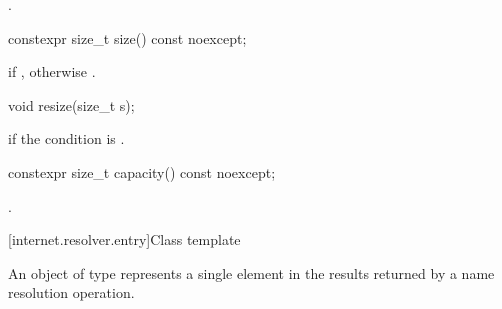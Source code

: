 \begin{itemdescr}
\pnum
\returns {}.
\end{itemdescr}

\begin{itemdecl}
constexpr size_t size() const noexcept;
\end{itemdecl}

\begin{itemdescr}
\pnum
\returns {} if , otherwise .
\end{itemdescr}

\begin{itemdecl}
void resize(size_t s);
\end{itemdecl}

\begin{itemdescr}
\pnum
\remarks {} if the condition  \tcode{||}  is .
\end{itemdescr}

\begin{itemdecl}
constexpr size_t capacity() const noexcept;
\end{itemdecl}

\begin{itemdescr}
\pnum
\returns {}.
\end{itemdescr}




%
[internet.resolver.entry]{Class template }

\pnum
An object of type  represents a single element in the results returned by a name resolution operation.

